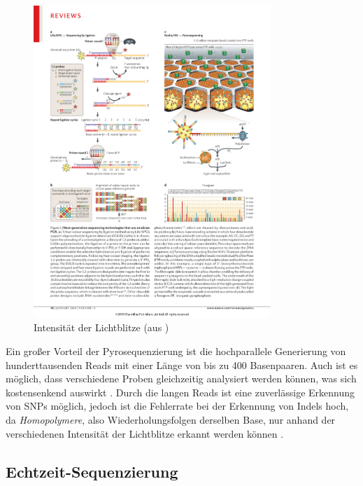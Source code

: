 \begin{figure}[H]
	\begin{center}
		\includegraphics[width=0.8\textwidth]{bilder/Sequenzierung_Pyro_Diagramm}
	\end{center}
	\caption{Intensität der Lichtblitze (aus \citet{Metzker2010})}
	\label{fig:bio:seq:pyro:diagram}
\end{figure}
Ein großer Vorteil der Pyrosequenzierung ist die hochparallele Generierung von hunderttausenden Reads mit einer Länge von bis zu 400 Basenpaaren. Auch ist es möglich, dass verschiedene Proben gleichzeitig analysiert werden können, was sich kostensenkend auswirkt \citep{Siqueira2012}. Durch die langen Reads ist eine zuverlässige Erkennung von SNPs möglich, jedoch ist die Fehlerrate bei der Erkennung von Indels hoch, da \textit{Homopolymere}, also Wiederholungsfolgen derselben Base, nur anhand der verschiedenen Intensität der Lichtblitze erkannt werden können \citep{Shendure2008}.
\subsection{Echtzeit-Sequenzierung}
\label{sec:bio:seq:realtime}

